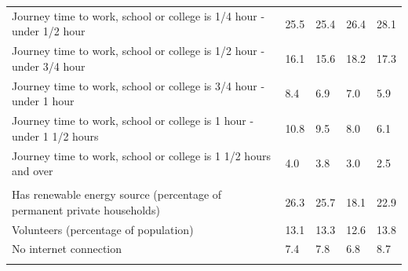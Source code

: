 \documentclass{article}
\begin{document}
\begin{table}[h]
\begin{tabular}{KTTTT}
Journey time to work, school or college is 1/4 hour - under 1/2 hour & 25.5& 25.4& 26.4& 28.1\\
Journey time to work, school or college is 1/2 hour - under 3/4 hour & 16.1& 15.6& 18.2& 17.3\\
Journey time to work, school or college is 3/4 hour - under 1 hour & 8.4& 6.9& 7.0& 5.9\\
Journey time to work, school or college is 1 hour - under 1 1/2 hours & 10.8&  9.5&  8.0&  6.1\\
Journey time to work, school or college is 1 1/2 hours and over & 4.0& 3.8& 3.0& 2.5\\
\hline
    \\ 
    \hline
Has renewable energy source (percentage of permanent private households) & 26.3& 25.7& 18.1& 22.9\\
    \hline
Volunteers (percentage of population) & 13.1& 13.3& 12.6& 13.8\\
    \hline
No internet connection& 7.4& 7.8& 6.8& 8.7\\
\hline
\end{tabular}
\end{table}
\end{document}
